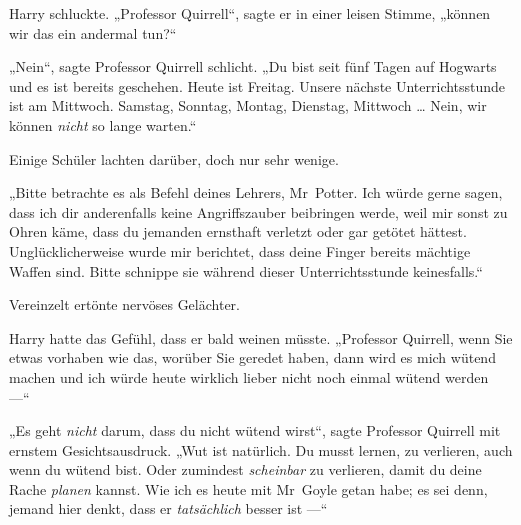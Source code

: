Harry schluckte.
„Professor Quirrell“, sagte er in einer leisen Stimme, „können wir das ein andermal tun?“

„Nein“, sagte Professor Quirrell schlicht.
„Du bist seit fünf Tagen auf Hogwarts und es ist bereits geschehen. Heute ist Freitag. Unsere nächste Unterrichtsstunde ist am Mittwoch. Samstag, Sonntag, Montag, Dienstag, Mittwoch … Nein, wir können \emph{nicht} so lange warten.“

Einige Schüler lachten darüber, doch nur sehr wenige.

„Bitte betrachte es als Befehl deines Lehrers, Mr~Potter. Ich würde gerne sagen, dass ich dir anderenfalls keine Angriffszauber beibringen werde, weil mir sonst zu Ohren käme, dass du jemanden ernsthaft verletzt oder gar getötet hättest. Unglücklicherweise wurde mir berichtet, dass deine Finger bereits mächtige Waffen sind. Bitte schnippe sie während dieser Unterrichtsstunde keinesfalls.“

Vereinzelt ertönte nervöses Gelächter.

Harry hatte das Gefühl, dass er bald weinen müsste.
„Professor Quirrell, wenn Sie etwas vorhaben wie das, worüber Sie geredet haben, dann wird es mich wütend machen und ich würde heute wirklich lieber nicht noch einmal wütend werden —“

„Es geht \emph{nicht} darum, dass du nicht wütend wirst“, sagte Professor Quirrell mit ernstem Gesichtsausdruck.
„Wut ist natürlich. Du musst lernen, zu verlieren, auch wenn du wütend bist. Oder zumindest \emph{scheinbar} zu verlieren, damit du deine Rache \emph{planen} kannst. Wie ich es heute mit Mr~Goyle getan habe; es sei denn, jemand hier denkt, dass er \emph{tatsächlich} besser ist —“

